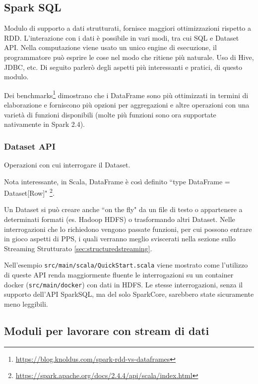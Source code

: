 \documentclass[12pt,italian]{article}
\begin{document}
\subsection{Spark SQL}
Modulo di supporto a dati strutturati, fornisce maggiori ottimizzazioni rispetto a RDD. L'interazione con i dati è possibile in vari modi, tra cui SQL e Dataset API.
Nella computazione viene usato un unico engine di esecuzione, il programmatore può esprire le cose nel modo che ritiene più naturale. Uso di Hive, JDBC, etc. 
\newline
Di seguito parlerò degli aspetti più interessanti e pratici, di questo modulo.
\par Dei benchmarks\footnote{\url{https://blog.knoldus.com/spark-rdd-vs-dataframes}} dimostrano che i DataFrame sono più ottimizzati in termini di elaborazione e forniscono più opzioni per aggregazioni e altre operazioni con una varietà di funzioni disponibili (molte più funzioni sono ora supportate nativamente in Spark 2.4).
\subsubsection{Dataset API}
Operazioni con cui interrogare il Dataset. 
\par Nota interessante, in Scala, DataFrame è così definito ``type DataFrame = Dataset[Row]" \footnote{\url{https://spark.apache.org/docs/2.4.4/api/scala/index.html}}.
\par Un Dataset si può creare anche ``on the fly" da un file di testo o appartenere a determinati formati (es. Hadoop HDFS) o trasformando altri Dataset.
Nelle interrogazioni che lo richiedono vengono passate funzioni, per cui possono entrare in gioco aspetti di PPS, i quali verranno meglio sviscerati nella sezione sullo Streaming Strutturato \ref{sec:structuredstreaming}.%
\par Nell'esempio \texttt{src/main/scala/QuickStart.scala} viene mostrato come l'utilizzo di queste API renda maggiormente fluente le interrogazioni su un container docker (\texttt{src/main/docker}) con dati in HDFS.
\newline 
Le stesse interrogazioni, senza il supporto dell'API SparkSQL, ma del solo SparkCore, sarebbero state sicuramente meno leggibili.%

\subsection{Moduli per lavorare con stream di dati}
\end{document}
